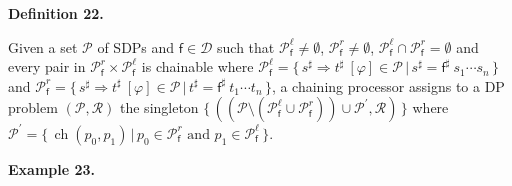\documentclass[10pt,a4paper]{amsart}
\begin{document}
 
 
\par\medskip\noindent\textbf{Definition 22.}\par
 
 
Given a set $\mathcal{P}$ of SDPs and $\mathsf{f}\in\mathcal{D}$ such that $\mathcal{P}_{\mathsf{f}}^{\ell}\neq\emptyset$, $\mathcal{P}_{\mathsf{f}}^{r}\neq\emptyset$, $\mathcal{P}_{\mathsf{f}}^{\ell}\cap\mathcal{P}_{\mathsf{f}}^{r}=\emptyset$ and every pair in $\mathcal{P}_{\mathsf{f}}^{r}\times\mathcal{P}_{\mathsf{f}}^{\ell}$ is chainable where $\mathcal{P}_{\mathsf{f}}^{\ell}=\{\,{s^{\sharp}}\Rightarrow{t^{\sharp}}\ [\varphi]\in\mathcal{P}\,|\,s^{\sharp}={\mathsf{f}^{\sharp}}\ {{s}_{1}\cdots{s}_{n}}\,\}$ and $\mathcal{P}_{\mathsf{f}}^{r}=\{\,{s^{\sharp}}\Rightarrow{t^{\sharp}}\ [\varphi]\in\mathcal{P}\,|\,t^{\sharp}={\mathsf{f}^{\sharp}}\ {{t}_{1}\cdots{t}_{n}}\,\}$, a chaining processor assigns to a DP problem $(\mathcal{P},\mathcal{R})$ the singleton $\{\,((\mathcal{P}\setminus(\mathcal{P}_{\mathsf{f}}^{\ell}\cup\mathcal{P}_{\mathsf{f}}^{r}))\cup\mathcal{P}^{\prime},\mathcal{R})\,\}$ where $\mathcal{P}^{\prime}=\{\,\operatorname{ch}(p_{0},p_{1})\,|\,p_{0}\in\mathcal{P}_{\mathsf{f}}^{r}\text{ and }p_{1}\in\mathcal{P}_{\mathsf{f}}^{\ell}\,\}$.\par
 
 
 
 
\par\medskip\noindent\textbf{Example 23.}\par
 
 
\end{document}
